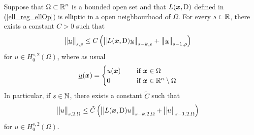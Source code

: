 \begin{prop} \label{ell_reg_in}
Suppose that $\displaystyle \Omega \subset \mathbb{R}^n$ is a bounded open
set and that $L({\bm{x}},\operatorname{D})$ defined in (\ref{ell_reg_ellOp}) is
elliptic in a open neighbourhood of $\overline{\Omega}$. 
For every $s\in \mathbb{R}$, there exists a constant $C>0$ such that
\begin{equation} \label{ell_reg_in_eqt}
\big\|\underline{u} \big\|_{s,\rho} \leq C \left(
\big\| L({\bm{x}},\operatorname{D}) \underline{u} \big\|_{s-k,\rho}
+ \big\|\underline{u}\big\|_{s-1,\rho} \right)
\end{equation}
for $\displaystyle u \in H^{s,2}_0(\Omega)$, where as usual
\[
\underline{u}({\bm{x}}) = \begin{cases}
u({\bm{x}}) & \quad \ \text{if} \ {\bm{x}} \in \Omega \\
0 & \quad \ \text{if} \ {\bm{x}} \in \mathbb{R}^n\setminus \Omega  
\end{cases}
\]
In particular, if $s \in \mathbb{N}$, there exists a constant $\tilde{C}$ such that
\begin{equation} \label{ell_reg_in_eqtV2}
\big\|u \big\|_{s,2,\Omega} \leq \tilde{C} \left(
\big\| L({\bm{x}},\operatorname{D}) u \big\|_{s-k,2,\Omega}
+ \big\|u\big\|_{s-1,2,\Omega} \right)
\end{equation}
for $\displaystyle u \in H^{s,2}_0(\Omega)$.
\end{prop}

